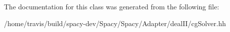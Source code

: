 The documentation for this class was generated from the following file\-:\begin{DoxyCompactItemize}
\item 
/home/travis/build/spacy-\/dev/\-Spacy/\-Spacy/\-Adapter/deal\-I\-I/cg\-Solver.\-hh\end{DoxyCompactItemize}
